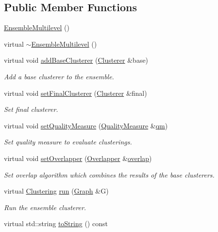 \subsection*{Public Member Functions}
\begin{DoxyCompactItemize}
\item 
\hyperlink{class_networ_kit_1_1_ensemble_multilevel_abb98d9bce5a20d4e1671a855e0236c0a}{Ensemble\-Multilevel} ()
\item 
virtual \hyperlink{class_networ_kit_1_1_ensemble_multilevel_a3eaa45f6f867e6afb50751565b42609c}{$\sim$\-Ensemble\-Multilevel} ()
\item 
virtual void \hyperlink{class_networ_kit_1_1_ensemble_multilevel_aa6ee44f370a906b114ca50e9d700fbea}{add\-Base\-Clusterer} (\hyperlink{class_networ_kit_1_1_clusterer}{Clusterer} \&base)
\begin{DoxyCompactList}\small\item\em Add a base clusterer to the ensemble. \end{DoxyCompactList}\item 
virtual void \hyperlink{class_networ_kit_1_1_ensemble_multilevel_a8e07f339de7ed28c6fc0501f6d1e6d47}{set\-Final\-Clusterer} (\hyperlink{class_networ_kit_1_1_clusterer}{Clusterer} \&final)
\begin{DoxyCompactList}\small\item\em Set final clusterer. \end{DoxyCompactList}\item 
virtual void \hyperlink{class_networ_kit_1_1_ensemble_multilevel_a95cb11b277ca5d73a965f53b73d8c6cf}{set\-Quality\-Measure} (\hyperlink{class_networ_kit_1_1_quality_measure}{Quality\-Measure} \&\hyperlink{class_networ_kit_1_1_ensemble_multilevel_a915aae76cd6660ae3a541d36969ebeea}{qm})
\begin{DoxyCompactList}\small\item\em Set quality measure to evaluate clusterings. \end{DoxyCompactList}\item 
virtual void \hyperlink{class_networ_kit_1_1_ensemble_multilevel_a37ff4e9548124f5d908efc763cf82ffc}{set\-Overlapper} (\hyperlink{class_networ_kit_1_1_overlapper}{Overlapper} \&\hyperlink{class_networ_kit_1_1_ensemble_multilevel_a4b3abd511fb680656839a9fc9b02c5db}{overlap})
\begin{DoxyCompactList}\small\item\em Set overlap algorithm which combines the results of the base clusterers. \end{DoxyCompactList}\item 
virtual \hyperlink{class_networ_kit_1_1_clustering}{Clustering} \hyperlink{class_networ_kit_1_1_ensemble_multilevel_a06877e20895c68ab431262e00b44ca4b}{run} (\hyperlink{class_networ_kit_1_1_graph}{Graph} \&G)
\begin{DoxyCompactList}\small\item\em Run the ensemble clusterer. \end{DoxyCompactList}\item 
virtual std\-::string \hyperlink{class_networ_kit_1_1_ensemble_multilevel_aa5954a8f62e107b0d8d34563b4596ddd}{to\-String} () const 
\end{DoxyCompactItemize}
